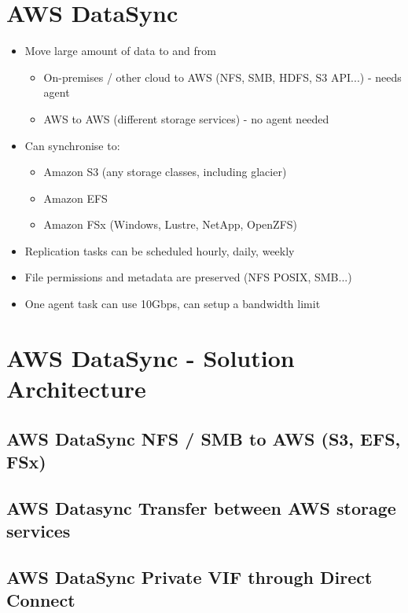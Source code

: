 \section{AWS DataSync}
\begin{itemize}
    \item Move large amount of data to and from
    \begin{itemize}
        \item On-premises / other cloud to AWS (NFS, SMB, HDFS, S3 API...) - needs agent
        \item AWS to AWS (different storage services) - no agent needed
    \end{itemize}
    \item Can synchronise to:
    \begin{itemize}
        \item Amazon S3 (any storage classes, including glacier)
        \item Amazon EFS
        \item Amazon FSx (Windows, Lustre, NetApp, OpenZFS)
    \end{itemize}
    \item Replication tasks can be scheduled hourly, daily, weekly
    \item File permissions and metadata are preserved (NFS POSIX, SMB...)
    \item One agent task can use 10Gbps, can setup a bandwidth limit
\end{itemize}


\section{AWS DataSync - Solution Architecture}

\subsection{AWS DataSync NFS / SMB to AWS (S3, EFS, FSx)}

\subsection{AWS Datasync Transfer between AWS storage services}

\subsection{AWS DataSync Private VIF through Direct Connect}



